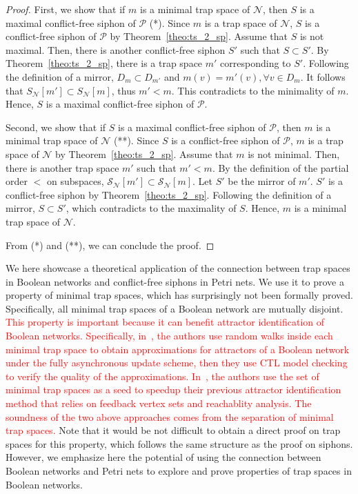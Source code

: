 \documentclass[preprint,12pt]{elsarticle}
\newcommand{\change}[1]{\textcolor{red}{#1}}
\begin{document}
\begin{proof}

  First, we show that if \(m\) is a minimal trap space of \(\mathcal{N}\), then \(S\) is a maximal conflict-free siphon of \(\mathcal{P}\) (*).
  Since \(m\) is a trap space of \(\mathcal{N}\), \(S\) is a conflict-free siphon of \(\mathcal{P}\) by Theorem~\ref{theo:ts_2_sp}. Assume that \(S\) is not maximal.
  Then, there is another conflict-free siphon \(S'\) such that \(S \subset S'\).
  By Theorem~\ref{theo:ts_2_sp}, there is a trap space \(m'\) corresponding to \(S'\).
  Following the definition of a mirror, \(D_m \subset D_{m'}\) and \(m(v) = m'(v), \forall v \in D_m\).
  It follows that \(S_{\mathcal{N}}[m'] \subset S_{\mathcal{N}}[m]\), thus \(m' < m\).
  This contradicts to the minimality of \(m\).
  Hence, \(S\) is a maximal conflict-free siphon of \(\mathcal{P}\).

  Second, we show that if \(S\) is a maximal conflict-free siphon of \(\mathcal{P}\), then \(m\) is a minimal trap space of \(\mathcal{N}\) (**).
  Since \(S\) is a conflict-free siphon of \(\mathcal{P}\), \(m\) is a trap space of \(\mathcal{N}\) by Theorem~\ref{theo:ts_2_sp}.
  Assume that \(m\) is not minimal.
  Then, there is another trap space \(m'\) such that \(m' < m\).
  By the definition of the partial order \(<\) on subspaces, \(\mathcal{S}_{\mathcal{N}}[m'] \subset \mathcal{S}_{\mathcal{N}}[m]\). Let \(S'\) be the mirror of \(m'\).
  \(S'\) is a conflict-free siphon by Theorem~\ref{theo:ts_2_sp}.
  Following the definition of a mirror, \(S \subset S'\), which contradicts to the maximality of \(S\).
  Hence, \(m\) is a minimal trap space of \(\mathcal{N}\).

  From (*) and (**), we can conclude the proof.
\end{proof}

We here showcase a theoretical application of the connection between trap spaces in Boolean networks and conflict-free siphons in Petri nets.
We use it to prove a property of minimal trap spaces, which has surprisingly not been formally proved.
Specifically, all minimal trap spaces of a Boolean network are mutually disjoint.
\change{This property is important because it can benefit attractor identification of Boolean networks.
Specifically, in~\cite{Klarner2015att}, the authors use random walks inside each minimal trap space to obtain approximations for attractors of a Boolean network under the fully asynchronous update scheme, then they use CTL model checking to verify the quality of the approximations.
In~\cite{DBLP:conf/bcb/TrinhHB22}, the authors use the set of minimal trap spaces as a seed to speedup their previous attractor identification method that relies on feedback vertex sets and reachablity analysis.
The soundness of the two above approaches comes from the separation of minimal trap spaces.
}
Note that it would be not difficult to obtain a direct proof on trap spaces for this property, which follows the same structure as the proof on siphons.
However, we emphasize here the potential of using the connection between Boolean networks and Petri nets to explore and prove properties of trap spaces in Boolean networks.
\end{document}
